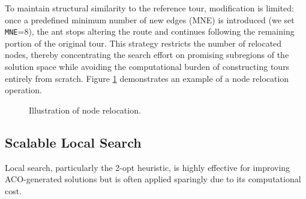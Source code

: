 \documentclass[a4paper,conference]{IEEEtran}
\begin{document}
To maintain structural similarity to the reference tour, modification is limited: once a predefined minimum number of new edges (MNE) is introduced (we set \texttt{MNE}=8), the ant stops altering the route and continues following the remaining portion of the original tour. This strategy restricts the number of relocated nodes, thereby concentrating the search effort on promising subregions of the solution space while avoiding the computational burden of constructing tours entirely from scratch. Figure \ref{fig:perm-swap} demonstrates an example of a node relocation operation.

\begin{figure}[ht]
    \centering
    \caption{Illustration of node relocation.}
    \label{fig:perm-swap}
\end{figure}

\subsection{Scalable Local Search}
Local search, particularly the 2-opt heuristic, is highly effective for improving ACO-generated solutions but is often applied sparingly due to its computational cost.
\end{document}
